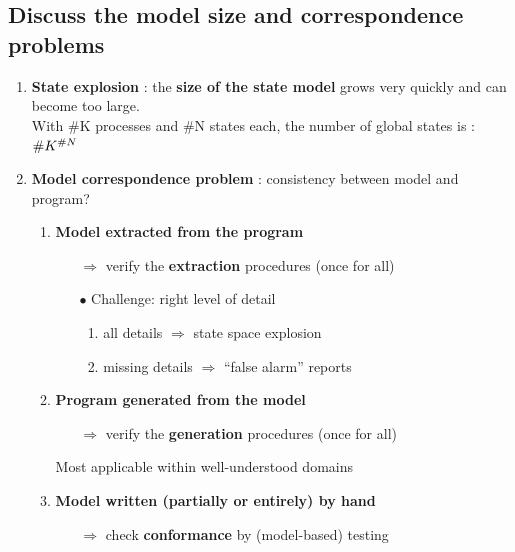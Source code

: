\documentclass{article}
\begin{document}
\subsection{Discuss the model size and correspondence problems}
\begin{enumerate}
    \item \textbf{State explosion} : the \textbf{size of the state model} grows very quickly and can become too large.\\
    With \#K processes and \#N states each, the number of global states is : $\#K^{\#N}
\\   $ \item \textbf{Model correspondence problem} : consistency between model and program?
    \begin{enumerate}
        \item \textbf{Model extracted from the program}
        \begin{itemize}
            \item [$\Rightarrow$]verify the \textbf{extraction} procedures (once for all)
            \item [$\bullet$]Challenge: right level of detail
            \begin{enumerate}
                \item all details  $\Rightarrow$ state space explosion
                \item missing details  $\Rightarrow$ “false alarm” reports
            \end{enumerate}
        \end{itemize}
        \item \textbf{Program generated from the model}
        \begin{itemize}
            \item [$\Rightarrow$]verify the \textbf{generation} procedures (once for all)

        \end{itemize}
        Most applicable within well-understood domains
        \item \textbf{Model written (partially or entirely) by hand}
        \begin{itemize}
            \item [$\Rightarrow$]check \textbf{conformance} by (model-based) testing
        \end{itemize}
    \end{enumerate}
    
\end{enumerate}
\end{document}
